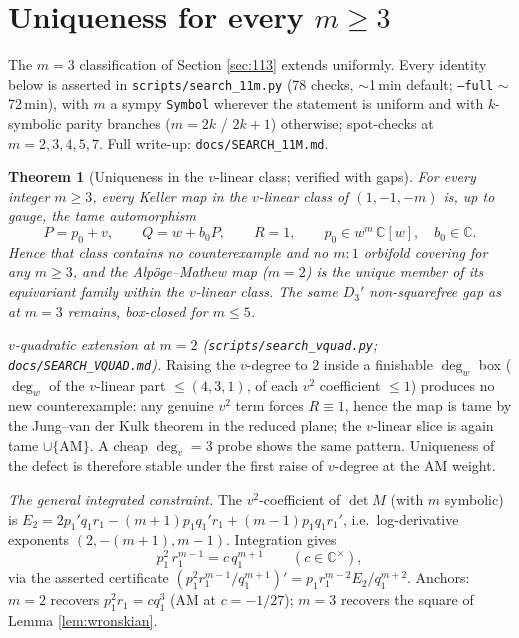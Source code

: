 \documentclass[11pt]{article}
\newtheorem{theorem}{Theorem}[section]
\theoremstyle{definition}
\theoremstyle{remark}
\newcommand{\C}{\mathbb{C}}
\begin{document}
\section{Uniqueness for every $m\ge 3$}\label{sec:11m}

The $m=3$ classification of Section \ref{sec:113} extends uniformly.
Every identity below is asserted in \texttt{scripts/search\_11m.py}
(78 checks, $\sim$1\,min default; \texttt{--full} $\sim$72\,min), with
$m$ a sympy \texttt{Symbol} wherever the statement is uniform and with
$k$-symbolic parity branches ($m=2k$ / $2k{+}1$) otherwise; spot-checks
at $m=2,3,4,5,7$. Full write-up: \texttt{docs/SEARCH\_11M.md}.

\begin{theorem}[Uniqueness in the $v$-linear class; verified with gaps]
\label{thm:11m}
For every integer $m\ge 3$, every Keller map in the $v$-linear class of
$(1,-1,-m)$ is, up to gauge, the tame automorphism
\[
P = p_0 + v,\qquad Q = w + b_0 P,\qquad R = 1,\qquad
p_0\in w^m\,\C[w],\quad b_0\in\C.
\]
Hence that class contains no counterexample and no $m{:}1$ orbifold
covering for any $m\ge 3$, and the Alp\"oge--Mathew map ($m=2$) is the
unique member of its equivariant family within the $v$-linear class.
The same $D_3'$ non-squarefree gap as at $m=3$ remains, box-closed for
$m\le 5$.
\end{theorem}

\emph{$v$-quadratic extension at $m=2$
(\texttt{scripts/search\_vquad.py}; \texttt{docs/SEARCH\_VQUAD.md}).}
Raising the $v$-degree to $2$ inside a finishable $\deg_w$ box
($\deg_w$ of the $v$-linear part $\le(4,3,1)$, of each $v^2$
coefficient $\le 1$) produces no new counterexample: any genuine
$v^2$ term forces $R\equiv 1$, hence the map is tame by the
Jung--van der Kulk theorem in the reduced plane; the $v$-linear slice
is again tame $\cup\{\textrm{AM}\}$. A cheap $\deg_v=3$ probe shows
the same pattern. Uniqueness of the defect is therefore stable under
the first raise of $v$-degree at the AM weight.

\emph{The general integrated constraint.} The $v^2$-coefficient of
$\det M$ (with $m$ symbolic) is
$E_2 = 2p_1'q_1r_1 - (m{+}1)p_1q_1'r_1 + (m{-}1)p_1q_1r_1'$,
i.e.\ log-derivative exponents $(2,-(m{+}1),m{-}1)$. Integration gives
\[
p_1^2\, r_1^{m-1} = c\, q_1^{m+1}\qquad (c\in\C^\times),
\]
via the asserted certificate
$(p_1^2 r_1^{m-1}/q_1^{m+1})' = p_1 r_1^{m-2} E_2 / q_1^{m+2}$.
Anchors: $m=2$ recovers $p_1^2 r_1 = c q_1^3$ (AM at $c=-1/27$);
$m=3$ recovers the square of Lemma \ref{lem:wronskian}.
\end{document}
